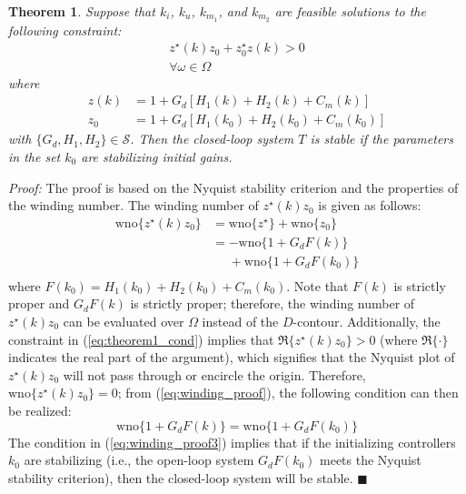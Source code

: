 \documentclass[a4paper, 10pt, conference]{ieeeconf}
\newtheorem{theorem}{Theorem}
\begin{document}
\begin{theorem} \label{Thm1}
Suppose that $k_i$, $k_u$, $k_{m_1}$, and $k_{m_2}$ are feasible solutions to the following constraint:
\begin{equation} \label{eq:theorem1_cond}
\begin{split}
z^{\star}(k)z_0+z_0^{\star}z(k) > 0 \\
\forall \omega \in \Omega
\end{split}
\end{equation}
where 
\begin{align*}
z(k) &= 1+G_d[H_1(k)+H_2(k)+C_m(k)] \\
z_0 &= 1+G_d[H_1(k_0)+H_2(k_0)+C_m(k_0)]
\end{align*}
with $\{G_d,H_1,H_2\} \in \mathscr{S}$. Then the closed-loop system $T$ is stable if the parameters in the set $k_0$ are stabilizing initial gains.
\end{theorem}

\textit{Proof:}
The proof is based on the Nyquist stability criterion and the properties of the winding number. The winding number of $z^{\star}(k)z_0$ is given as follows:
\begin{equation} \label{eq:winding_proof}
\begin{aligned}
{\mbox{wno}} \{ z^{\star}(k)z_0\} &= {\mbox{wno}} \{ z^{\star}\} + {\mbox{wno}} \{ z_0\} \\
&= -{\mbox{wno}} \{ 1+G_dF(k)\} \\
&\phantom{=} + {\mbox{wno}} \{ 1+G_dF(k_0)\} \\
\end{aligned}
\end{equation}
where $F(k_0) = H_1(k_0) + H_2(k_0) + C_m(k_0)$. Note that $F(k)$ is strictly proper and $G_dF(k)$ is strictly proper; therefore, the winding number of $z^{\star}(k)z_0$ can be evaluated over $\Omega$ instead of the $D$-contour. Additionally, the constraint in (\ref{eq:theorem1_cond}) implies that $\Re\{ z^{\star}(k)z_0\} > 0$ (where $\Re\{ \cdot \}$ indicates the real part of the argument), which signifies that the Nyquist plot of $z^{\star}(k)z_0$ will not pass through or encircle the origin. Therefore, $\mbox{wno} \{ z^{\star}(k)z_0\} = 0$; from (\ref{eq:winding_proof}), the following condition can then be realized:
\begin{equation} \label{eq:winding_proof3}
\mbox{wno} \{ 1+G_dF(k)\} = {\mbox{wno}} \{ 1+G_dF(k_0)\}
\end{equation}
The condition in (\ref{eq:winding_proof3}) implies that if the initializing controllers $k_0$ are stabilizing (i.e., the open-loop system $G_dF(k_0)$ meets the Nyquist stability criterion), then the closed-loop system will be stable.
{\hfill \ensuremath{\blacksquare}}
\end{document}
